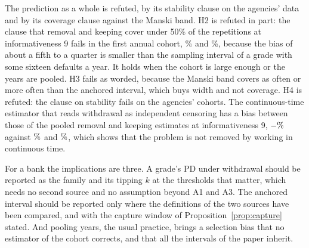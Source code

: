 The prediction as a whole is refuted, by its stability clause on the agencies' data and by its coverage clause against the Manski band. H2 is refuted in part: the clause that removal and keeping cover under 50\% of the repetitions at informativeness 9 fails in the first annual cohort, \% and \%, because the bias of about a fifth to a quarter is smaller than the sampling interval of a grade with some sixteen defaults a year. It holds when the cohort is large enough or the years are pooled. H3 fails as worded, because the Manski band covers as often or more often than the anchored interval, which buys width and not coverage. H4 is refuted: the clause on stability fails on the agencies' cohorts. The continuous-time estimator that reads withdrawal as independent censoring has a bias between those of the pooled removal and keeping estimates at informativeness 9, $-\nv{dur.i9.abias}\%$ against $\nv{bias.pool.i9.industry}\%$ and $\nv{bias.pool.i9.unfollowed}\%$, which shows that the problem is not removed by working in continuous time.

For a bank the implications are three. A grade's PD under withdrawal should be reported as the family and its tipping $k$ at the thresholds that matter, which needs no second source and no assumption beyond A1 and A3. The anchored interval should be reported only where the definitions of the two sources have been compared, and with the capture window of Proposition~\ref{prop:capture} stated. And pooling years, the usual practice, brings a selection bias that no estimator of the cohort corrects, and that all the intervals of the paper inherit.
